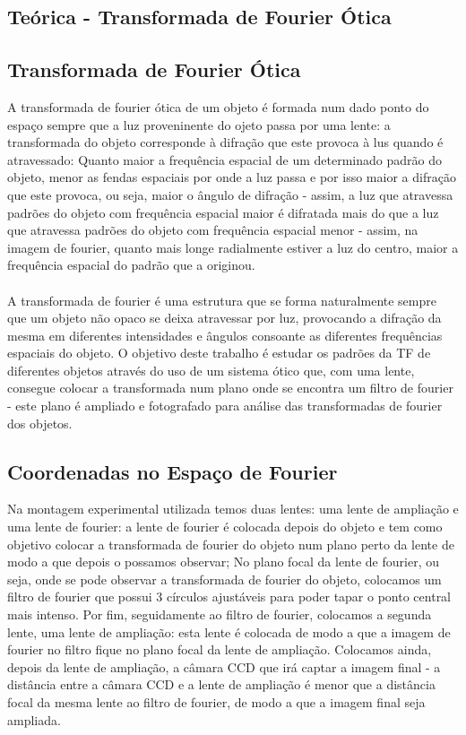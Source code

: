 \documentclass{article}
\begin{document}
\begin{multicols}{2}

\section{Teórica  - Transformada de Fourier Ótica}

\subsection{Transformada de Fourier Ótica}

A transformada de fourier ótica de um objeto é formada num dado ponto do espaço sempre que a luz proveninente do ojeto passa por uma lente: a transformada do objeto corresponde à difração que este provoca à lus quando é atravessado:
Quanto maior a frequência espacial de um determinado padrão do objeto, menor as fendas espaciais por onde a luz passa e por isso maior a difração que este provoca, ou seja, maior o ângulo de difração - assim, a luz que atravessa padrões do objeto com frequência espacial maior é difratada mais do que a luz que atravessa padrões do objeto com frequência espacial menor - assim, na imagem de fourier, quanto mais longe radialmente estiver a luz do centro, maior a frequência espacial do padrão que a originou.
\paragraph{}
A transformada de fourier é uma estrutura que se forma naturalmente sempre que um objeto não opaco se deixa atravessar por luz, provocando a difração da mesma em diferentes intensidades e ângulos consoante as diferentes frequências espaciais do objeto.
O objetivo deste trabalho é estudar os padrões da TF de diferentes objetos através do uso de um sistema ótico que, com uma lente, consegue colocar a transformada num plano onde se encontra um filtro de fourier - este plano é ampliado e fotografado para análise das transformadas de fourier dos objetos.

\subsection{Coordenadas no Espaço de Fourier}

Na montagem experimental utilizada temos duas lentes: uma lente de ampliação e uma lente de fourier: a lente de fourier é colocada depois do objeto e tem como objetivo colocar a transformada de fourier do objeto num plano perto da lente de modo a que depois o possamos observar;
No plano focal da lente de fourier, ou seja, onde se pode observar a transformada de fourier do objeto, colocamos um filtro de fourier que possui 3 círculos ajustáveis para poder tapar o ponto central mais intenso.
Por fim, seguidamente ao filtro de fourier, colocamos a segunda lente, uma lente de ampliação: esta lente é colocada de modo a que a imagem de fourier no filtro fique no plano focal da lente de ampliação. 
Colocamos ainda, depois da lente de ampliação, a câmara CCD que irá captar a imagem final - a distância entre a câmara CCD e a lente de ampliação é menor que a distância focal da mesma lente ao filtro de fourier, de modo a que a imagem final seja ampliada.

\end{multicols}
\end{document}

